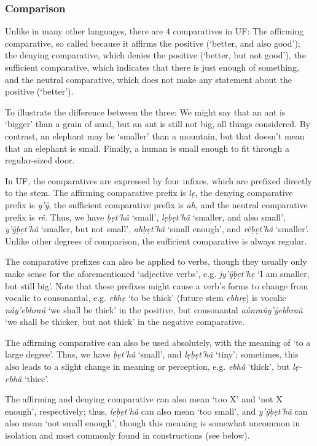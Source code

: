 \documentclass[a4paper, 12pt, twoside, final]{article}
\let \w \textit
\begin{document}
\subsubsection{Comparison}\label{subsubsec:comparison}
Unlike in many other languages, there are 4 comparatives in UF: The affirming comparative, so called
because it affirms the positive (‘better, and also good’); the denying comparative, which denies the positive
(‘better, but not good’), the sufficient comparative, which indicates that there is just enough of something,
and the neutral comparative, which does not make any statement about the positive (‘better’).

To illustrate the difference between the three: We might say that an ant is ‘bigger’ than a grain of sand, but
an ant is still not big, all things considered. By contrast, an elephant may be ‘smaller’ than a mountain,
but that doesn’t mean that an elephant is small. Finally, a human is small enough to fit through a regular-sized
door.

In UF, the comparatives are expressed by four infixes, which are prefixed directly to the stem. The affirming
comparative prefix is \w{lẹ}, the denying comparative prefix is \w{y’ŷ}, the sufficient comparative prefix is \w{ah},
and the neutral comparative prefix is \w{rê}. Thus, we have \w{ḅẹt’hâ} ‘small’, \w{lẹḅẹt’hâ} ‘smaller, and also small’,
\w{y’ŷḅẹt’hâ} ‘smaller, but not small’, \w{ahḅẹt’hâ} ‘small enough’, and \w{rêḅẹt’hâ} ‘smaller’. Unlike other degrees
of comparison, the sufficient comparative is always regular.

The comparative prefixes can also be applied to verbs, though they usually only make sense for the aforementioned
‘adjective verbs’, e.g. \w{jy’ŷḅẹt’hẹ} ‘I am smaller, but still big’. Note that these prefixes
might cause a verb’s forms to change from vocalic to consonantal, e.g. \w{ebhẹ} ‘to be thick’ (future stem \w{ebhrẹ})
is vocalic \w{náy’ebhraú} ‘we shall be thick’ in the positive, but consonantal \w{aúnraûy’ŷebhraû} ‘we shall be
thicker, but not thick’ in the negative comparative.

The affirming comparative can also be used absolutely, with the meaning of ‘to a large degree’. Thus,
we have \w{ḅẹt’hâ} ‘small’, and \w{lẹḅẹt’hâ} ‘tiny’; sometimes, this also leads to a slight change in meaning
or perception, e.g. \w{ebhâ} ‘thick’, but \w{lẹ-ebhâ} ‘thicc’.

The affirming and denying comparative can also mean ‘too X’ and ‘not X enough’, respectively; thus, \w{lẹḅẹt’hâ}
can also mean ‘too small’, and \w{y’ŷḅẹt’hâ} can also mean ‘not small enough’, though this meaning is somewhat
uncommon in isolation and most commonly found in constructions (see below).
\end{document}
